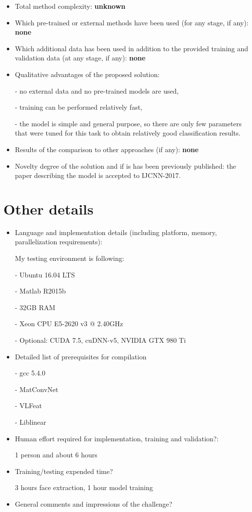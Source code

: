 \documentclass{article}
\begin{document}
\begin{itemize}
\item Total method complexity: \textbf{unknown}
\item Which pre-trained or external methods have been used (for any stage, if any): \textbf{none}
\item Which additional data has been used in addition to the provided training and validation data (at any stage, if any): \textbf{none} 
\item Qualitative advantages of the proposed solution: 

- no external data and no pre-trained models are used, 

- training can be performed relatively fast,

- the model is simple and general purpose, so there are only few parameters that were  tuned for this task to obtain relatively good classification results.

\item Results of the comparison to other approaches (if any): \textbf{none}

\item Novelty degree of the solution and if is has been previously published: the paper describing the model is accepted to IJCNN-2017.
\end{itemize}

\section{Other details}

\begin{itemize}
\item Language and implementation details (including platform, memory, parallelization requirements): 

My testing environment is following:

- Ubuntu 16.04 LTS

- Matlab R2015b

- 32GB RAM

- Xeon CPU E5-2620 v3 @ 2.40GHz

- Optional: CUDA 7.5, cuDNN-v5, NVIDIA GTX 980 Ti

\item Detailed list of prerequisites for compilation

- gcc 5.4.0

- MatConvNet

- VLFeat

- Liblinear

\item Human effort required for implementation, training and validation?: 

1 person and about 6 hours

\item Training/testing expended time? 

3 hours face extraction, 1 hour model training

\item General comments and impressions of the challenge?
\end{itemize}
\end{document}
